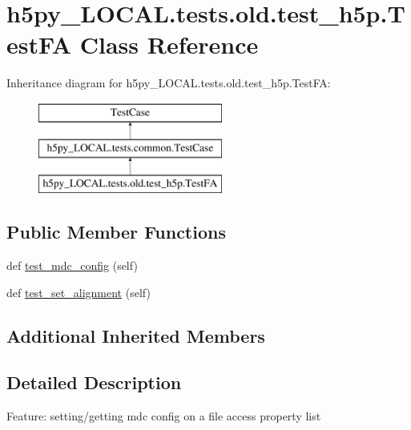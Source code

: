 \hypertarget{classh5py__LOCAL_1_1tests_1_1old_1_1test__h5p_1_1TestFA}{}\section{h5py\+\_\+\+L\+O\+C\+A\+L.\+tests.\+old.\+test\+\_\+h5p.\+Test\+FA Class Reference}
\label{classh5py__LOCAL_1_1tests_1_1old_1_1test__h5p_1_1TestFA}
Inheritance diagram for h5py\+\_\+\+L\+O\+C\+A\+L.\+tests.\+old.\+test\+\_\+h5p.\+Test\+FA\+:\begin{figure}[H]
\begin{center}
\leavevmode
\includegraphics[height=3.000000cm]{classh5py__LOCAL_1_1tests_1_1old_1_1test__h5p_1_1TestFA}
\end{center}
\end{figure}
\subsection*{Public Member Functions}
\begin{DoxyCompactItemize}
\item 
def \hyperlink{classh5py__LOCAL_1_1tests_1_1old_1_1test__h5p_1_1TestFA_acc91b91207037d195aea77dab24a6fd6}{test\+\_\+mdc\+\_\+config} (self)
\item 
def \hyperlink{classh5py__LOCAL_1_1tests_1_1old_1_1test__h5p_1_1TestFA_ae2e172ffff1c0093ce8ba5da29a0278e}{test\+\_\+set\+\_\+alignment} (self)
\end{DoxyCompactItemize}
\subsection*{Additional Inherited Members}


\subsection{Detailed Description}
\begin{DoxyVerb}Feature: setting/getting mdc config on a file access property list
\end{DoxyVerb}
 

